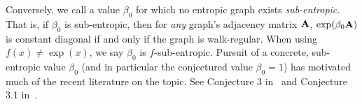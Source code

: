 Conversely, we call a value $\beta_0$ for which no entropic graph exists \emph{sub-entropic}.
That is, if $\beta_0$ is sub-entropic, then for \emph{any} graph's adjacency matrix $\textbf{A}$, $\exp(\beta_0 \textbf{A})$ is constant diagonal if and only if the graph is walk-regular.
When using $f(x)\neq \exp(x)$, we say $\beta_0$ is $f$-sub-entropic.
Pursuit of a concrete, sub-entropic value $\beta_0$ (and in particular the conjectured value $\beta_0 = 1$) has motivated much of the recent literature on the topic.
See Conjecture 3 in~\cite{estrada2013discriminant} and Conjecture 3.1 in~\cite{benzi2014note}.
